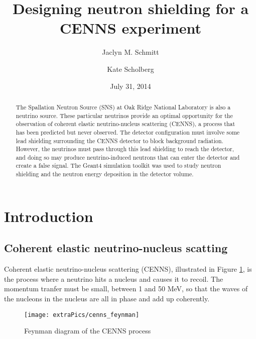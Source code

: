 \documentclass[12pt]{article}
\begin{document}
 

\title{Designing neutron shielding for a CENNS experiment} 

\author[1]{Jaclyn M. Schmitt} 
\author[2]{Kate Scholberg} 
\date{July 31, 2014} 

\maketitle
\begin{abstract}
The Spallation Neutron Source (SNS) at Oak Ridge National Laboratory is also a neutrino source.  These particular neutrinos provide an optimal opportunity for the observation of coherent elastic neutrino-nucleus scattering (CENNS), a process that has been predicted but never observed. The detector configuration must involve some lead shielding surrounding the CENNS detector to block background radiation. However, the neutrinos must pass through this lead shielding to reach the detector, and doing so may produce neutrino-induced neutrons that can enter the detector and create a false signal. The Geant4 simulation toolkit was used to study neutron shielding and the neutron energy deposition in the detector volume.
\end{abstract}
\newpage

\section{Introduction}

\subsection{Coherent elastic neutrino-nucleus scatting \cite{CSI}}

Coherent elastic neutrino-nucleus scattering (CENNS), illustrated in Figure \ref{fig:cenns}, is the process where a neutrino hits a nucleus and causes it to recoil. The momentum tranfer must be small, between 1 and 50 MeV, so that the waves of the nucleons in the nucleus are all in phase and add up coherently. 

\begin{figure}[H] 
  \caption{Feynman diagram of the CENNS process \cite{ppt}} 
  \texttt{[image: extraPics/cenns\_feynman]} 
  \label{fig:cenns} 
  \centering 
\end{figure}
\end{document}
